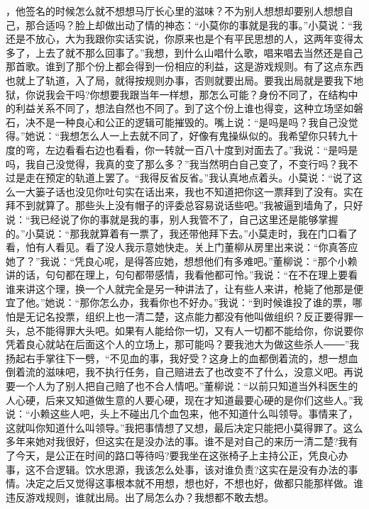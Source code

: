 \documentclass[12pt,oneside]{book}
\begin{document}
，他签名的时候怎么就不想想马厅长心里的滋味？不为别人想想却要别人想想自己，那合适吗？脸上却做出动了情的神态：``小莫你的事就是我的事。''小莫说：``我还是不放心，大为我跟你实话实说，你原来也是个有平民思想的人，这两年变得太多了，上去了就不那么回事了。''我想，到什么山唱什么歌，唱来唱去当然还是自己那首歌。谁到了那个份上都会得到一份相应的利益，这是游戏规则。有了这点东西也就上了轨道，入了局，就得按规则办事，否则就要出局。要我出局就是要我下地狱，你说我会干吗?你想要我跟当年一样想，那怎么可能？身份不同了，在结构中的利益关系不同了，想法自然也不同了。到了这个份上谁也得变，这种立场坚如磐石，决不是一种良心和公正的逻辑可能摧毁的。嘴上说：``是吗是吗？我自己没觉得。''她说：``我想怎么人一上去就不同了，好像有鬼操纵似的。我希望你只转九十度的弯，左边看看右边也看看，你一转就一百八十度到对面去了。''我说：``是吗是吗，我自己没觉得，我真的变了那么多？''我当然明白自己变了，不变行吗？我不过是走在预定的轨道上罢了。``我得反省反省。''我认真地点着头。小莫说：``说了这么一大篓子话也没见你吐句实在话出来，我也不知道把你这一票拜到了没有。实在拜不到就算了。那些头上没有帽子的评委总容易说话些吧。''我被逼到墙角了，只好说：``我已经说了你的事就是我的事，别人我管不了，自己这里还是能够掌握的。''小莫说：``那我就算着有一票了，我还带他拜下去。''小莫走时，我在门口看了看，怕有人看见。看了没人我示意她快走。关上门董柳从房里出来说：``你真答应她了？''我说：``凭良心呢，是得答应她，想想他们有多难吧。''董柳说：``那个小赖讲的话，句句都在理上，句句都带感情，我看他都可怜。''我说：``在不在理上要看谁来讲这个理，换一个人就完全是另一种讲法了，让有些人来讲，枪毙了他那是便宜了他。''她说：``那你怎么办，我看你也不好办。''我说：``到时候谁投了谁的票，哪怕是无记名投票，组织上也一清二楚，这点能力都没有他叫做组织？反正要得罪一头，总不能得罪大头吧。如果有人能给你一切，又有人一切都不能给你，你说要你凭着良心就站在后面这个人的立场上，那可能吗？要我池大为做这些杀人───''我扬起右手掌往下一劈，``不见血的事，我好受？这身上的血都倒着流的，想一想血倒着流的滋味吧，我不执行任务，自己赔进去了也改变不了什么，没意义吧。再说要一个人为了别人把自己赔了也不合人情吧。''董柳说：``以前只知道当外科医生的人心硬，后来又知道做生意的人要心硬，现在才知道最要心硬的是你们这些人。''我说：``小赖这些人吧，头上不碰出几个血包来，他不知道什么叫领导。事情来了，这就叫你知道什么叫领导。''我把事情想了又想，最后决定只能把小莫得罪了。这么多年来她对我很好，但这实在是没办法的事。谁不是对自己的来历一清二楚?我有了今天，是公正在时间的路口等待吗?要我坐在这张椅子上主持公正，凭良心办事，这不合逻辑。饮水思源，我该怎么处事，该对谁负责?这实在是没有办法的事情。决定之后又觉得这事根本就不用想，想也好，不想也好，做都只能那样做。谁违反游戏规则，谁就出局。出了局怎么办？我想都不敢去想。
\end{document}
